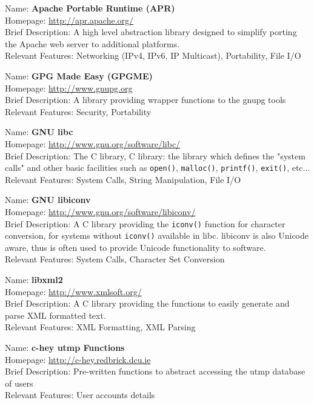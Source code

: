 
Name: 	\textbf{Apache Portable Runtime (APR)} \\
Homepage: 	\url{http://apr.apache.org/}	\\	
Brief Description: 	A high level abstraction library designed to 
simplify porting the Apache web server to additional platforms. \\
Relevant Features: Networking (IPv4, IPv6, IP Multicast), Portability, 
File I/O


Name:		\textbf{GPG Made Easy (GPGME)}	\\
Homepage:		\url{http://www.gnupg.org}	\\
Brief Description: A library providing wrapper functions to the gnupg tools \\
Relevant Features: Security, Portability


Name:		\textbf{GNU libc}	\\	
Homepage:		\url{http://www.gnu.org/software/libc/}	\\
Brief Description: The C library, C library: the library which
defines the "system calls" and other basic facilities such as 
\verb+open()+, \verb+malloc()+, \verb+printf()+, \verb+exit()+, etc... \\
Relevant Features: System Calls, String Manipulation, File I/O


Name:		\textbf{GNU libiconv}	\\	
Homepage:		\url{http://www.gnu.org/software/libiconv/}	\\
Brief Description: A C library providing the \verb+iconv()+ function for
character conversion, for systems without \verb+iconv()+ available in
libc. libiconv is also Unicode aware, thus is often used to provide
Unicode functionality to software. \\
Relevant Features: System Calls, Character Set Conversion


Name:		\textbf{libxml2}	\\	
Homepage:		\url{http://www.xmlsoft.org/}	\\
Brief Description: A C library providing the functions to easily
generate and parse XML formatted text. \\
Relevant Features: XML Formatting, XML Parsing


Name:		\textbf{c-hey utmp Functions}	\\	
Homepage:		\url{http://c-hey.redbrick.dcu.ie}	\\
Brief Description: Pre-written functions to abstract accessing the utmp
database of users \\
Relevant Features: User accounts details

